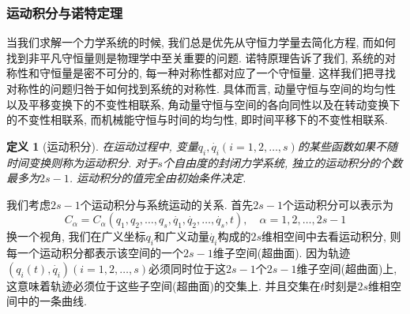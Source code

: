\documentclass[a4paper,11pt]{article}
\newtheorem{definition}{\hspace{2em}定义}[section]
\begin{document}
\subsubsection{运动积分与诺特定理}
当我们求解一个力学系统的时候, 我们总是优先从守恒力学量去简化方程, 而如何找到非平凡守恒量则是物理学中至关重要的问题. 诺特原理告诉了我们, 系统的对称性和守恒量是密不可分的, 每一种对称性都对应了一个守恒量. 这样我们把寻找对称性的问题归咎于如何找到系统的对称性. 具体而言, 动量守恒与空间的均匀性以及平移变换下的不变性相联系, 角动量守恒与空间的各向同性以及在转动变换下的不变性相联系, 而机械能守恒与时间的均匀性, 即时间平移下的不变性相联系.
\begin{definition}[运动积分]
  在运动过程中, 变量$q_i,\dot{q_i}(i=1,2,\dots,s)$的某些函数如果不随时间变换则称为运动积分. 对于$s$个自由度的封闭力学系统, 独立的运动积分的个数最多为$2s-1$. 运动积分的值完全由初始条件决定.
\end{definition}
我们考虑$2s-1$个运动积分与系统运动的关系. 首先$2s-1$个运动积分可以表示为
\begin{equation*}
  C_\alpha=C_\alpha(q_1,q_2,\dots,q_s,\dot{q_1},\dot{q_2},\dots,\dot{q_s},t),\quad \alpha=1,2,\dots,2s-1
\end{equation*}
换一个视角, 我们在广义坐标$q_i$和广义动量$\dot{q_i}$构成的$2s$维相空间中去看运动积分, 则每一个运动积分都表示该空间的一个$2s-1$维子空间(超曲面). 因为轨迹$(q_i(t),\dot{q_i})(i=1,2,\dots,s)$必须同时位于这$2s-1$个$2s-1$维子空间(超曲面)上, 这意味着轨迹必须位于这些子空间(超曲面)的交集上. 并且交集在$t$时刻是$2s$维相空间中的一条曲线.
\end{document}
